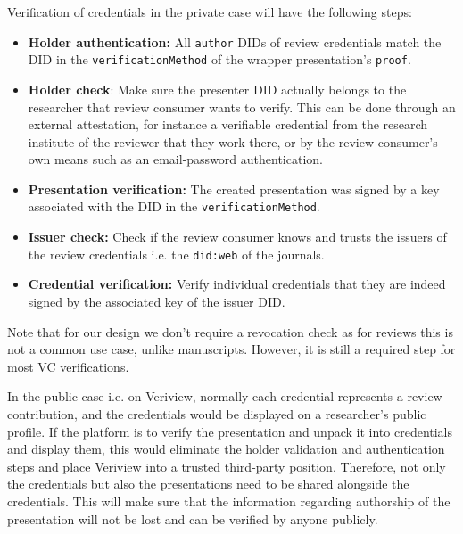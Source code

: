 Verification of credentials in the private case will have the following steps:
\begin{itemize}
    \item \textbf{Holder authentication:} All \lstinline{author} \acrshort{DID}s of review credentials match the \acrshort{DID} in the \lstinline{verificationMethod} of the wrapper presentation's \lstinline{proof}.
    
    \item \textbf{Holder check}: Make sure the presenter \acrshort{DID} actually belongs to the researcher that review consumer wants to verify. This can be done through an external attestation, for instance a verifiable credential from the research institute of the reviewer that they work there, or by the review consumer's own means such as an email-password authentication. 
    
    \item \textbf{Presentation verification:} The created presentation was signed by a key associated with the \acrshort{DID} in the \lstinline{verificationMethod}.
    
    \item \textbf{Issuer check:} Check if the review consumer knows and trusts the issuers of the review credentials i.e. the \lstinline{did:web} of the journals.
    
    \item \textbf{Credential verification:} Verify individual credentials that they are indeed signed by the associated key of the issuer \acrshort{DID}.
\end{itemize}

Note that for our design we don't require a revocation check as for reviews this is not a common use case, unlike manuscripts. However, it is still a required step for most \acrshort{VC} verifications.

In the public case i.e. on Veriview, normally each credential represents a review contribution, and the credentials would be displayed on a researcher's public profile. If the platform is to verify the presentation and unpack it into credentials and display them, this would eliminate the holder validation and authentication steps and place Veriview into a trusted third-party position. Therefore, not only the credentials but also the presentations need to be shared alongside the credentials. This will make sure that the information regarding authorship of the presentation will not be lost and can be verified by anyone publicly. 

